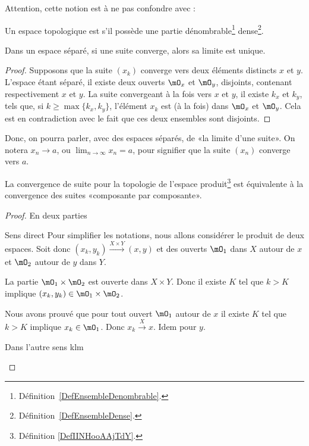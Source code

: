 Attention, cette notion est à ne pas confondre avec :
\begin{definition}  \label{DefUADooqilFK}
    Un espace topologique est  s'il possède une partie dénombrable\footnote{Définition~\ref{DefEnsembleDenombrable}.} dense\footnote{Définition~\ref{DefEnsembleDense}.}.
\end{definition}

\begin{proposition}\label{PropUniciteLimitePourSuites}
  Dans un espace séparé, si une suite converge, alors sa limite est unique.
\end{proposition}
\begin{proof}
  Supposons que la suite \( (x_k)\) converge vers deux éléments distincts \( x \) et \( y \). L'espace étant séparé, il existe deux ouverts \( \mO_x \) et \( \mO_y \), disjoints, contenant respectivement \( x \) et \( y \). La suite convergeant à la fois vers \( x \) et \( y \), il existe \( k_x \) et \( k_y \), tels que, si \( k \geq \max\{k_x, k_y\} \), l'élément  \( x_k \) est (à la fois) dans  \( \mO_x \) et \( \mO_y \). Cela est en contradiction avec le fait que ces deux ensembles sont disjoints.
\end{proof}

\begin{normaltext}
  Donc, on pourra parler, avec des espaces séparés, de «la limite d'une suite». On notera \( x_n\to a\), ou \(\lim_{n\to \infty} x_n = a \), pour signifier que la suite \( (x_n) \) converge vers \( a \). 
\end{normaltext}

\begin{proposition}      \label{PROPooNRRIooCPesgO}
    La convergence de suite pour la topologie de l'espace produit\footnote{Définition \ref{DefIINHooAAjTdY}.} est équivalente à la convergence des suites «composante par composante».
\end{proposition}

\begin{proof}
    En deux parties
    \begin{subproof}
        \item[Sens direct]
            Pour simplifier les notations, nous allons considérer le produit de deux espaces. Soit donc \( (x_k,y_k)\stackrel{X\times Y}{\longrightarrow}(x,y)\) et des ouverts \( \mO_1\) dans \( X\) autour de \( x\) et \( \mO_2\) autour de \( y\) dans \( Y\). 

            La partie \( \mO_1\times \mO_2\) est ouverte dans \( X\times Y\). Donc il existe \( K\) tel que \( k>K\) implique \( (x_k,y_k)\in \mO_1\times \mO_2\).

            Nous avons prouvé que pour tout ouvert \( \mO_1\) autour de \( x\) il existe \( K\) tel que \( k>K\) implique \( x_k\in \mO_1\). Donc \( x_k\stackrel{X}{\longrightarrow}x\). Idem pour \( y\).

        \item[Dans l'autre sens]
            klm
    \end{subproof}
\end{proof}

